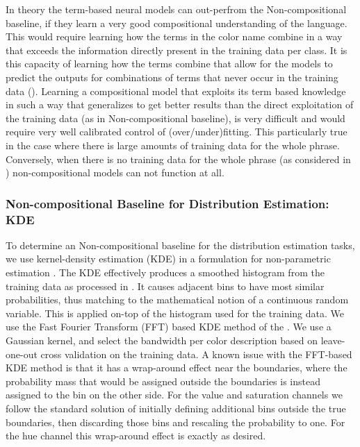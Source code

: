 \documentclass[]{clv3}
\newcommand{\parencite}{\citep}
\newcommand{\textcite}{\citet}
\newcommand{\empmodel}{Non-compositional baseline} %
\begin{document}
In theory the term-based neural models can out-perfrom the \empmodel{}, if they learn a very good compositional understanding of the language.
This would require learning how the terms in the color name combine in a way that exceeds the information directly present in the training data per class.
It is this capacity of learning how the terms combine that allow for the models to predict the outputs for combinations of terms that never occur in the training data ().
Learning a compositional model that exploits its term based knowledge in such a way  that generalizes to get better results than the direct exploitation of the training data (as in \empmodel{}), is very difficult and would require very well calibrated control of (over/under)fitting.
This particularly true in the case where there is large amounts of training data for the whole phrase.
Conversely, when there is no training data for the whole phrase (as considered in ) non-compositional models can not function at all.



\subsubsection{Non-compositional Baseline for Distribution Estimation: KDE}\label{sec:direct-histogram} \label{sec:kernel-density-based-smoothing}
To determine an \empmodel{} for the distribution estimation tasks,
we use kernel-density estimation (KDE) in a formulation for non-parametric estimation \parencite{silverman1986density} .
The KDE effectively produces a smoothed histogram from the training data as processed in .
It causes adjacent bins to have most similar probabilities, thus matching to the mathematical notion of a continuous random variable.
This is applied on-top of the histogram used for the training data.
We use the Fast Fourier Transform (FFT) based KDE method of the \textcite{silverman1982algorithm}.
We use a Gaussian kernel, and select the bandwidth per color description based on leave-one-out cross validation on the training data.
A known issue with the FFT-based KDE method is that it has a wrap-around effect near the boundaries, where the probability mass that would be assigned outside the boundaries is instead assigned to the bin on the other side.
For the value and saturation channels we follow the standard solution of initially defining additional bins outside the true boundaries, then discarding those bins and rescaling the probability to one.
For the hue channel this wrap-around effect is exactly as desired.
\end{document}
